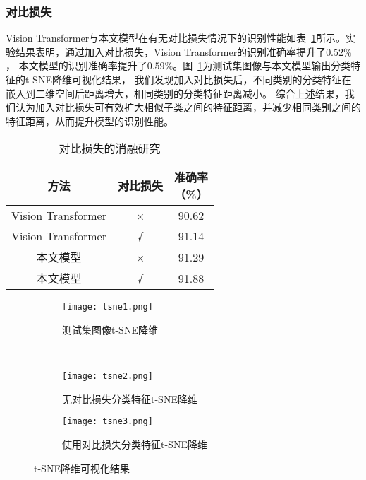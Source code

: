 \subsubsection{对比损失}
Vision Transformer与本文模型在有无对比损失情况下的识别性能如表~\ref{table:con_loss}所示。实验结果表明，通过加入对比损失，Vision Transformer的识别准确率提升了$0.52\%$，
本文模型的识别准确率提升了$0.59\%$。图~\ref{fig:tsne}为测试集图像与本文模型输出分类特征的t-SNE\cite{van2008visualizing}降维可视化结果，
我们发现加入对比损失后，不同类别的分类特征在嵌入到二维空间后距离增大，相同类别的分类特征距离减小。
综合上述结果，我们认为加入对比损失可有效扩大相似子类之间的特征距离，并减少相同类别之间的特征距离，从而提升模型的识别性能。

\begin{table}[htbp]
  \caption{对比损失的消融研究}   
  \centering 
  \label{table:con_loss}
  \begin{tabular}{ccc}
    \toprule[2pt]
    方法 & 对比损失 & \makecell{准确率 \\（\%）} \\
    \midrule[1.5pt] 
        Vision Transformer & × & 90.62  \\ 
        Vision Transformer & √ & 91.14  \\ 
        本文模型 & × & 91.29  \\ 
        本文模型 & √ & 91.88  \\ 
    \bottomrule[2pt]      
  \end{tabular} 
\end{table}

\begin{figure}[htbp]
	\centering
  \begin{subfigure}{0.45\linewidth}
    \centering
    \texttt{[image: tsne1.png]}
    \caption{测试集图像t-SNE降维}
  \end{subfigure}
  \\
	\centering
	\begin{subfigure}{0.45\linewidth}
		\centering
		\texttt{[image: tsne2.png]}
    \caption{无对比损失分类特征t-SNE降维}
	\end{subfigure}
	\centering
	\begin{subfigure}{0.45\linewidth}
		\centering
		\texttt{[image: tsne3.png]}
    \caption{使用对比损失分类特征t-SNE降维}
	\end{subfigure}
  \caption{t-SNE降维可视化结果}
	\label{fig:tsne}
\end{figure}

